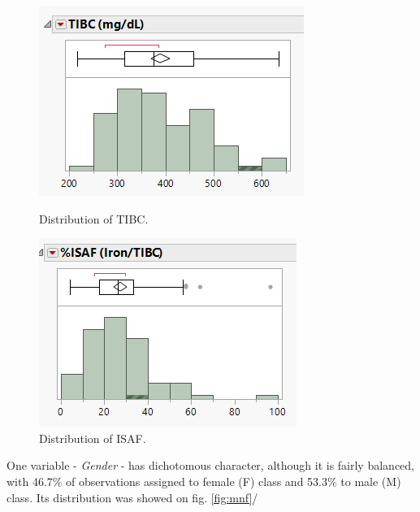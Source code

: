 	\begin{figure}[!ht]
		\begin{minipage}{0.40\textwidth}
			\centering
			\includegraphics[width=0.9\linewidth]{Rozdzial3/decision}
			\caption{Distribution of TIBC.}
			\label{fig:decision}		
		\end{minipage}%
		\hspace{0.10\textwidth}
		\begin{minipage}{0.40\textwidth}
			\centering
			\includegraphics[width=0.9\linewidth]{Rozdzial3/decision1}
			\caption{Distribution of ISAF.}
			\label{fig:decision1}			
		\end{minipage}
	\end{figure}
	
	One variable - \textit{Gender} - has dichotomous character, although it is fairly balanced, with 46.7\% of observations assigned to female (F) class and 53.3\% to male (M) class. Its distribution was showed on fig. \ref{fig:mnf}/
	
